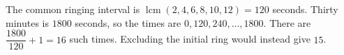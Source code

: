 The common ringing interval is $\operatorname{lcm}(2,4,6,8,10,12)=120$ seconds. Thirty minutes is $1800$ seconds, so the times are $0,120,240,\ldots,1800$. There are $\dfrac{1800}{120}+1=\boxed{16}$ such times. Excluding the initial ring would instead give $15$.
